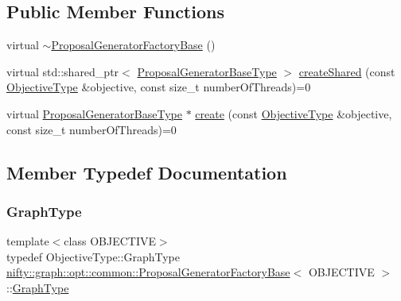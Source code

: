 \subsection*{Public Member Functions}
\begin{DoxyCompactItemize}
\item 
virtual \hyperlink{classnifty_1_1graph_1_1opt_1_1common_1_1ProposalGeneratorFactoryBase_ac642f5e8339031640ea41e5b70b41d45}{$\sim$\+Proposal\+Generator\+Factory\+Base} ()
\item 
virtual std\+::shared\+\_\+ptr$<$ \hyperlink{classnifty_1_1graph_1_1opt_1_1common_1_1ProposalGeneratorFactoryBase_a262cfc7056a43871e15130dd4435dee7}{Proposal\+Generator\+Base\+Type} $>$ \hyperlink{classnifty_1_1graph_1_1opt_1_1common_1_1ProposalGeneratorFactoryBase_a0c4cfed6cb2b4ac7244d1a076a0ec3b7}{create\+Shared} (const \hyperlink{classnifty_1_1graph_1_1opt_1_1common_1_1ProposalGeneratorFactoryBase_abb308b47da6f89126f786b394be0efc5}{Objective\+Type} \&objective, const size\+\_\+t number\+Of\+Threads)=0
\item 
virtual \hyperlink{classnifty_1_1graph_1_1opt_1_1common_1_1ProposalGeneratorFactoryBase_a262cfc7056a43871e15130dd4435dee7}{Proposal\+Generator\+Base\+Type} $\ast$ \hyperlink{classnifty_1_1graph_1_1opt_1_1common_1_1ProposalGeneratorFactoryBase_af204ed86b80c6885983dfcf822eb3b7b}{create} (const \hyperlink{classnifty_1_1graph_1_1opt_1_1common_1_1ProposalGeneratorFactoryBase_abb308b47da6f89126f786b394be0efc5}{Objective\+Type} \&objective, const size\+\_\+t number\+Of\+Threads)=0
\end{DoxyCompactItemize}


\subsection{Member Typedef Documentation}
\mbox{\label{classnifty_1_1graph_1_1opt_1_1common_1_1ProposalGeneratorFactoryBase_ab4c28c6e8dd7fa7616c704a8bcc7dfdc}} 
\subsubsection{\texorpdfstring{Graph\+Type}{GraphType}}
{\footnotesize\ttfamily template$<$class O\+B\+J\+E\+C\+T\+I\+VE$>$ \\
typedef Objective\+Type\+::\+Graph\+Type \hyperlink{classnifty_1_1graph_1_1opt_1_1common_1_1ProposalGeneratorFactoryBase}{nifty\+::graph\+::opt\+::common\+::\+Proposal\+Generator\+Factory\+Base}$<$ O\+B\+J\+E\+C\+T\+I\+VE $>$\+::\hyperlink{classnifty_1_1graph_1_1opt_1_1common_1_1ProposalGeneratorFactoryBase_ab4c28c6e8dd7fa7616c704a8bcc7dfdc}{Graph\+Type}}


